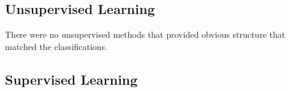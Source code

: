 \subsection{Unsupervised Learning}
There were no unsupervised methods that provided obvious structure  that matched the classifications.  





\subsection{Supervised Learning}